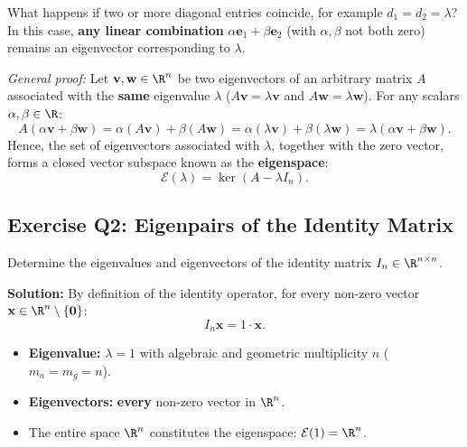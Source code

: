 \begin{property}
What happens if two or more diagonal entries coincide, for example $d_1 = d_2 = \lambda$?
In this case, \textbf{any linear combination} $\alpha \mathbf{e}_1 + \beta \mathbf{e}_2$ (with $\alpha, \beta$ not both zero) remains an eigenvector corresponding to $\lambda$.

\medskip
\noindent\textit{General proof:} Let $\mathbf{v}, \mathbf{w} \in \R^n$ be two eigenvectors of an arbitrary matrix $A$ associated with the \textbf{same} eigenvalue $\lambda$ ($A\mathbf{v} = \lambda \mathbf{v}$ and $A\mathbf{w} = \lambda \mathbf{w}$). For any scalars $\alpha, \beta \in \R$:
\begin{equation}
    A(\alpha \mathbf{v} + \beta \mathbf{w}) = \alpha (A\mathbf{v}) + \beta (A\mathbf{w}) = \alpha (\lambda \mathbf{v}) + \beta (\lambda \mathbf{w}) = \lambda (\alpha \mathbf{v} + \beta \mathbf{w}).
\end{equation}
Hence, the set of eigenvectors associated with $\lambda$, together with the zero vector, forms a closed vector subspace known as the \textbf{eigenspace}:
\begin{equation}
    \mathcal{E}(\lambda) = \ker(A - \lambda I_n).
\end{equation}
\end{property}

\subsection{Exercise Q2: Eigenpairs of the Identity Matrix}

\begin{example}
\label{ex:q2-identity-matrix}
Determine the eigenvalues and eigenvectors of the identity matrix $I_n \in \R^{n \times n}$.

\noindent\textbf{Solution:}
By definition of the identity operator, for every non-zero vector $\mathbf{x} \in \R^n \setminus \{\mathbf{0}\}$:
\begin{equation}
    I_n \mathbf{x} = 1 \cdot \mathbf{x}.
\end{equation}
\begin{itemize}
    \item \textbf{Eigenvalue:} $\lambda = 1$ with algebraic and geometric multiplicity $n$ ($m_a = m_g = n$).
    \item \textbf{Eigenvectors:} \textbf{every} non-zero vector in $\R^n$.
    \item The entire space $\R^n$ constitutes the eigenspace: $\mathcal{E}(1) = \R^n$.
\end{itemize}
\end{example}

